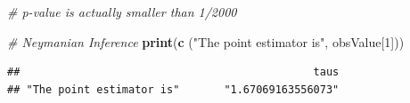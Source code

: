 \documentclass[]{article}
\newenvironment{Shaded}{\begin{snugshade}}{\end{snugshade}}
\newcommand{\KeywordTok}[1]{\textcolor[rgb]{0.13,0.29,0.53}{\textbf{#1}}}
\newcommand{\DecValTok}[1]{\textcolor[rgb]{0.00,0.00,0.81}{#1}}
\newcommand{\StringTok}[1]{\textcolor[rgb]{0.31,0.60,0.02}{#1}}
\newcommand{\CommentTok}[1]{\textcolor[rgb]{0.56,0.35,0.01}{\textit{#1}}}
\newcommand{\NormalTok}[1]{#1}
\begin{document}
\begin{Shaded}
\begin{Highlighting}[]
\CommentTok{# p-value is actually smaller than 1/2000}
\end{Highlighting}
\end{Shaded}

\begin{Shaded}
\begin{Highlighting}[]
\CommentTok{# Neymanian Inference}
\KeywordTok{print}\NormalTok{(}\KeywordTok{c}\NormalTok{ (}\StringTok{"The point estimator is"}\NormalTok{, obsValue[}\DecValTok{1}\NormalTok{]))}
\end{Highlighting}
\end{Shaded}

\begin{verbatim}
##                                              taus 
## "The point estimator is"       "1.67069163556073"
\end{verbatim}
\end{document}
